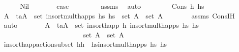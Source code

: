 \begin{isabellebody}
\ \ \ \ \isamarkupfalse%
\ Nil\isanewline
\ \ \ \ \isamarkupfalse%
\ \isamarkupfalse%
\ {\isacharquery}{\kern0pt}case\ \isanewline
\ \ \ \ \ \ \isamarkupfalse%
\ assms\ \isamarkupfalse%
\ auto\isanewline
\ \ \isamarkupfalse%
\isanewline
\ \ \ \ \isamarkupfalse%
\ {\isacharparenleft}{\kern0pt}Cons\ h\ hs\isanewline
\ \ \ \ \isamarkupfalse%
\ A{\isacharprime}{\kern0pt}\ \ {\isachardoublequoteopen}{\isacharparenleft}{\kern0pt}t\isactrlsub a{\isacharcomma}{\kern0pt}A{\isacharprime}{\kern0pt}{\isacharparenright}{\kern0pt}\ {\isasymin}\ set\ {\isacharparenleft}{\kern0pt}insort{\isacharunderscore}{\kern0pt}mult{\isacharunderscore}{\kern0pt}happs\ hs\ hs\ \ {\isachardoublequoteopen}set\ A\ {\isasymsubseteq}\ set\ A{\isacharprime}{\kern0pt}{\isachardoublequoteclose}\isanewline
\ \ \ \ \ \ \isamarkupfalse%
\ assms\ Cons{\isachardot}{\kern0pt}IH\ \isamarkupfalse%
\ auto\isanewline
\ \ \ \ \isamarkupfalse%
\ \isamarkupfalse%
\ A{\isacharprime}{\kern0pt}{\isacharprime}{\kern0pt}\ \ {\isachardoublequoteopen}{\isacharparenleft}{\kern0pt}t\isactrlsub a{\isacharcomma}{\kern0pt}A{\isacharprime}{\kern0pt}{\isacharprime}{\kern0pt}{\isacharparenright}{\kern0pt}\ {\isasymin}\ set\ {\isacharparenleft}{\kern0pt}insort{\isacharunderscore}{\kern0pt}happ\ h\ {\isacharparenleft}{\kern0pt}insort{\isacharunderscore}{\kern0pt}mult{\isacharunderscore}{\kern0pt}happs\ hs\ hs\ \isanewline
\ \ \ \ \ \ \ \ \ \ \ \ \ \ \ \ \ \ \ \ \ \ \ \ {\isachardoublequoteopen}set\ A{\isacharprime}{\kern0pt}\ {\isasymsubseteq}\ set\ A{\isacharprime}{\kern0pt}{\isacharprime}{\kern0pt}{\isachardoublequoteclose}\isanewline
\ \ \ \ \ \ \isamarkupfalse%
\ insort{\isacharunderscore}{\kern0pt}happ{\isacharunderscore}{\kern0pt}action{\isacharunderscore}{\kern0pt}subset{\isacharbrackleft}{\kern0pt}\ h{\isacharequal}{\kern0pt}{\isachardoublequoteopen}h{\isachardoublequoteclose}\ \ hs{\isacharequal}{\kern0pt}{\isachardoublequoteopen}insort{\isacharunderscore}{\kern0pt}mult{\isacharunderscore}{\kern0pt}happs\ hs\ hs\ \isamarkupfalse%

\end{isabellebody}
